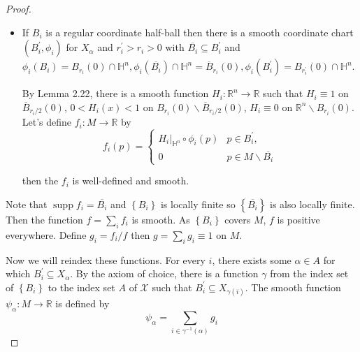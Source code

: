\begin{proof}
\begin{itemize}
              then the \( f_{i} \) is well-defined and smooth, for it is zero on the overlap \( B_{i}^{\prime} \smallsetminus \overline{B_{i}} \).
        \item If \( B_{i} \) is a regular coordinate half-ball then there is a smooth coordinate chart \( (B_{i}^{\prime}, \phi_{i}) \) for \( X_{\alpha} \) and \( r_{i}^{\prime} > r_{i} > 0 \) with \( \overline{B_{i}} \subseteq B_{i}^{\prime} \) and \( \phi_{i}(B_{i}) = B_{r_{i}}(0) \cap \mathbb{H}^{n}, \phi_{i}(\overline{B_{i}}) \cap \mathbb{H}^{n} = \overline{B}_{r_{i}}(0), \phi_{i}(B_{i}^{\prime}) = B_{r_{i}^{\prime}}(0) \cap \mathbb{H}^{n} \).

              By Lemma 2.22, there is a smooth function \( H_{i}: \mathbb{R}^{n} \to \mathbb{R} \) such that \( H_{i} \equiv 1 \) on \( \overline{B}_{r_{i}/2}(0) \), \( 0 < H_{i}(x) < 1 \) on \( B_{r_{i}}(0) \smallsetminus \overline{B}_{r_{i}/2}(0) \), \( H_{i} \equiv 0 \) on \( \mathbb{R}^{n} \smallsetminus B_{r_{i}}(0) \). Let's define \( f_{i}: M \to \mathbb{R} \) by
              \[
                  f_{i}(p) = \begin{cases}
                      H_{i}\vert_{\mathbb{H}^{n}} \circ \phi_{i}(p) & p \in B_{i}^{\prime},                   \\
                      0                                             & p \in M \smallsetminus \overline{B_{i}}
                  \end{cases}
              \]

              then the \( f_{i} \) is well-defined and smooth.
    \end{itemize}

    Note that \( \operatorname{supp} f_{i} = \overline{B_{i}} \) and \( \left\{ B_{i} \right\} \) is locally finite so \( \left\{ \overline{B_{i}} \right\} \) is also locally finite. Then the function \( f = \sum_{i} f_{i} \) is smooth. As \( \left\{ B_{i} \right\} \) covers \( M \), \( f \) is positive everywhere. Define \( g_{i} = f_{i}/f \) then \( g = \sum_{i} g_{i} \equiv 1 \) on \( M \).

    Now we will reindex these functions. For every \( i \), there exists some \( \alpha \in A \) for which \( B_{i}^{\prime} \subseteq X_{\alpha} \). By the axiom of choice, there is a function \( \gamma \) from the index set of \( \left\{ B_{i} \right\} \) to the index set \( A \) of \( \mathcal{X} \) such that \( B_{i}^{\prime} \subseteq X_{\gamma(i)} \). The smooth function \( \psi_{\alpha}: M \to \mathbb{R} \) is defined by
    \[
        \psi_{\alpha} = \sum_{i \in \gamma^{-1}(\alpha)} g_{i}
    \]


\end{proof}
